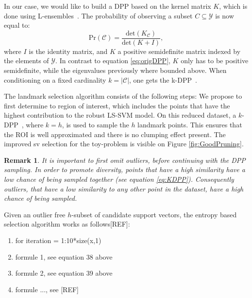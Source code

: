 \documentclass[preprint,12pt]{elsarticle}
\newtheorem*{remark}{Remark}
\begin{document}
In our case, we would like to build a DPP based on the kernel matrix $K$, which is done using L-ensembles~\cite{borodin2009determinantal}. The probability of observing a subset $C \subseteq \mathcal{Y}$ is now equal to:
\begin{equation}
	\mathrm{Pr}(\mathcal{C}) = \frac{\mathrm{det}(K_{\mathcal{C}})}{\mathrm{det}(K + I)},
\end{equation}
where $I$ is the identity matrix, and $K$ a positive semidefinite matrix  indexed by the elements of $\mathcal{Y}$. In contrast to equation \eqref{eq:origDPP}, $K$ only has to be positive semidefinite, while the eigenvalues previously where bounded above. When conditioning on a fixed cardinality $k = |\mathcal{C}|$, one gets the k-DPP~\cite{kulesza2011k}.

The landmark selection algorithm consists of the following steps:
We propose to first determine to region of interest, which includes the points that have the highest contribution to the robust LS-SVM model. On this reduced dataset, a $k$-DPP~\cite{kulesza2011k}, where $k = h$, is used to sample the $h$ landmark points. This ensures that the ROI is well approximated and there is no clumping effect present. The improved sv selection for the toy-problem is visible on Figure \ref{fig:GoodPruning}.

\begin{remark}
It is important to first omit outliers, before continuing with the DPP sampling. In order to promote diversity, points that have a high similarity have a low chance of being sampled together (see equation \eqref{eq:KDPP}). Consequently outliers, that have a low similarity to any other point in the dataset, have a high chance of being sampled.
\end{remark}

Given an outlier free $h$-subset of candidate support vectors, the entropy based selection algorithm works as follows[REF]:
\begin{enumerate}
	\item for iteration = 1:10*size(x,1)
	\item formule 1, see equation 38 above
	\item formule 2, see equation 39 above
	\item formule ..., see [REF]
\end{enumerate}

\newpage
\end{document}
